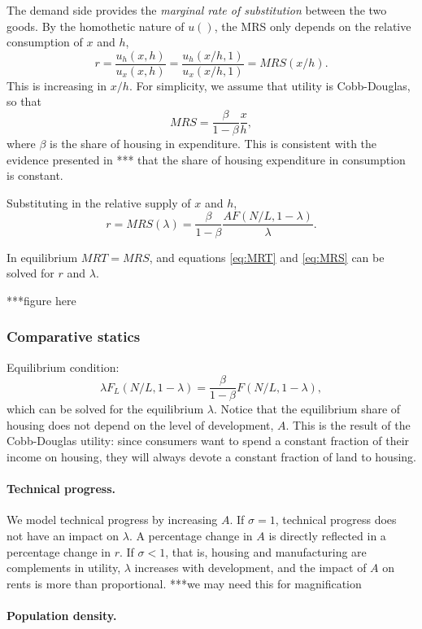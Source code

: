 \documentclass[12pt]{article}
\begin{document}
The demand side provides the \emph{marginal rate of substitution} between the two goods. By the homothetic nature of $u()$, the MRS only depends on the relative consumption of $x$ and $h$,
\[
r = \frac{u_h(x,h)}{u_x(x,h)} = \frac{u_h(x/h,1)}{u_x(x/h,1)} = MRS(x/h).
\]
This is increasing in $x/h$. For simplicity, we assume that utility is Cobb-Douglas, so that
\[
MRS = \frac{\beta}{1-\beta}\frac{x}{h},
\]
where $\beta$ is the share of housing in expenditure. This is consistent with the evidence presented in *** that the share of housing expenditure in consumption is constant.

Substituting in the relative supply of $x$ and $h$,
\begin{equation}\label{eq:MRS}
r = MRS({\lambda}) = \frac{\beta}{1-\beta}\frac{AF(N/L,1-{\lambda})}{{\lambda}}.
\end{equation}

In equilibrium $MRT=MRS$, and equations \eqref{eq:MRT} and \eqref{eq:MRS} can be solved for $r$ and ${\lambda}$.

***figure here

\subsubsection{Comparative statics}
Equilibrium condition:
\[
{{\lambda}F_L(N/L,1-{\lambda})} = \frac{\beta}{1-\beta}F(N/L,1-{\lambda}),
\]
which can be solved for the equilibrium ${\lambda}$. Notice that the equilibrium share of housing does not depend on the level of development, $A$. This is the result of the Cobb-Douglas utility: since consumers want to spend a constant fraction of their income on housing, they will always devote a constant fraction of land to housing.

\paragraph{Technical progress.} We model technical progress by increasing $A$. If $\sigma=1$, technical progress does not have an impact on ${\lambda}$. A percentage change in $A$ is directly reflected in a percentage change in $r$. If $\sigma<1$, that is, housing and manufacturing are complements in utility, ${\lambda}$ increases with development, and the impact of $A$ on rents is more than proportional. ***we may need this for magnification
\paragraph{Population density.}
\end{document}
